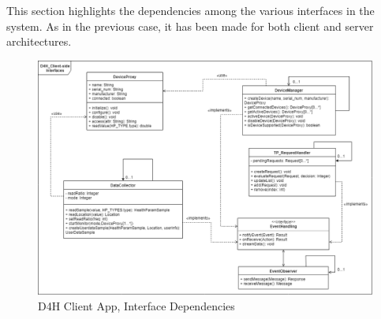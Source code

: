\begin{flushleft}
{}
{\setlength{\parskip}{0.3cm}
This section highlights the dependencies among the various interfaces in the system. As in the previous case, it has been made for both client and server architectures.

{}
\begin{figure}[H]
	\centering
	\includegraphics[scale=0.3]{images/uml/D4H_client_interfaces}
	\caption{D4H Client App, Interface Dependencies}
	\label{Figure 14}
\end{figure}


{}


}
\end{flushleft}
